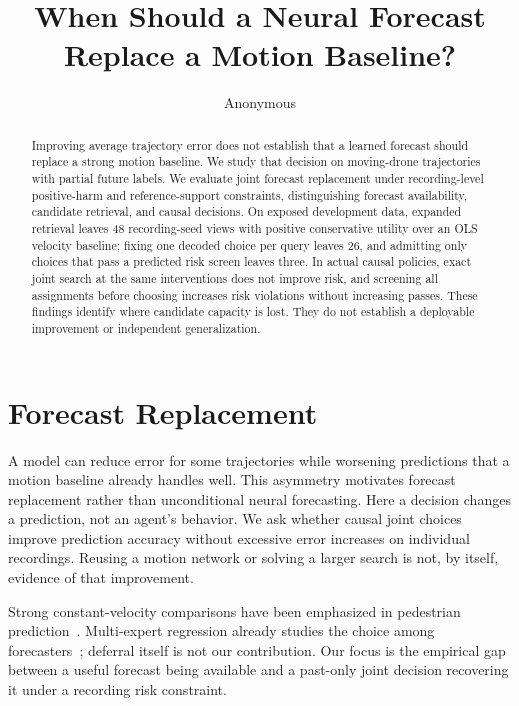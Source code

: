 \documentclass[10pt,twocolumn,letterpaper]{article}
\title{When Should a Neural Forecast Replace a Motion Baseline?}
\author{Anonymous}
\begin{document}
\maketitle

\begin{abstract}
Improving average trajectory error does not establish that a learned
forecast should replace a strong motion baseline. We study that
decision on moving-drone trajectories with partial future labels.
We evaluate joint forecast replacement under recording-level
positive-harm and reference-support constraints, distinguishing
forecast availability, candidate retrieval, and causal decisions.
On exposed development data, expanded retrieval leaves 48 recording-seed
views with positive conservative utility over an OLS velocity baseline;
fixing one decoded choice per query leaves 26, and admitting only
choices that pass a predicted risk screen leaves three. In actual
causal policies, exact joint search at the same interventions does
not improve risk, and screening all assignments before choosing
increases risk violations without increasing passes. These findings
identify where candidate capacity is lost. They do not establish a
deployable improvement or independent generalization.
\end{abstract}

\section{Forecast Replacement}
A model can reduce error for some trajectories while worsening
predictions that a motion baseline already handles well. This
asymmetry motivates forecast replacement rather than unconditional
neural forecasting. Here a decision changes a prediction, not an
agent's behavior. We ask whether causal joint choices improve
prediction accuracy without excessive error increases on individual
recordings. Reusing a motion network or solving a larger search is
not, by itself, evidence of that improvement.

Strong constant-velocity comparisons have been emphasized in
pedestrian prediction~\cite{schoeller}. Multi-expert regression
already studies the choice among forecasters~\cite{mao}; deferral
itself is not our contribution. Our focus is the empirical gap
between a useful forecast being available and a past-only joint
decision recovering it under a recording risk constraint.
\end{document}
